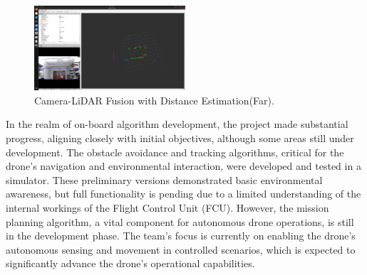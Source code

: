 \begin{figure}[H]
    \centerline{\includegraphics[width=0.5\textwidth]{Figures/Results/fusion6_with_distance.png}}
    \caption{Camera-LiDAR Fusion with Distance Estimation(Far).}
    \label{fig3b4}
\end{figure}

In the realm of on-board algorithm development, the project made substantial progress, aligning closely with initial objectives, although some areas still under development. The obstacle avoidance and tracking algorithms, critical for the drone's navigation and environmental interaction, were developed and tested in a simulator. These preliminary versions demonstrated basic environmental awareness, but full functionality is pending due to a limited understanding of the internal workings of the Flight Control Unit (FCU). However, the mission planning algorithm, a vital component for autonomous drone operations, is still in the development phase. The team's focus is currently on enabling the drone's autonomous sensing and movement in controlled scenarios, which is expected to significantly advance the drone’s operational capabilities.


